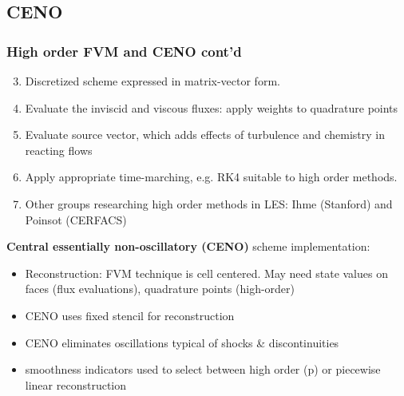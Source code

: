 \documentclass{beamer}
\begin{document}

\subsection{CENO}
\begin{frame}
\scriptsize
\frametitle{High order FVM and CENO cont'd} 

\begin{minipage}[t][1\textheight]{1\textwidth}
\scriptsize

\begin{enumerate}[1.]
\setcounter{enumi}{2}
\item Discretized scheme expressed in matrix-vector form.
\item Evaluate the inviscid and viscous fluxes: apply weights to quadrature points
\item Evaluate source vector, which adds effects of turbulence and chemistry in reacting flows
\item Apply appropriate time-marching, e.g. RK4 suitable to high order methods.
\item Other groups researching high order methods in LES: Ihme (Stanford) and Poinsot (CERFACS)
\end{enumerate}

\textbf{Central essentially non-oscillatory (CENO)} scheme implementation:
\begin{itemize}
\item Reconstruction: FVM technique is cell centered. May need state values on faces (flux evaluations), quadrature points (high-order)
\item CENO uses fixed stencil for reconstruction
\item CENO eliminates oscillations typical of shocks \& discontinuities
\item smoothness indicators used to select between high order (p) or piecewise linear reconstruction
\end{itemize}
\vspace{-20pt}
\end{minipage}

\end{frame}

\end{document}
